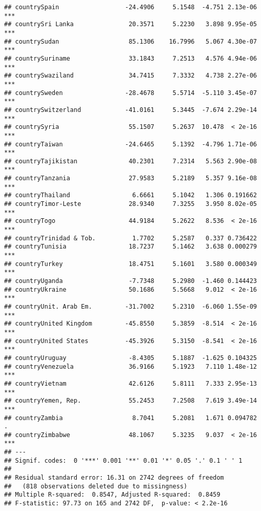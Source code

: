 \documentclass[
  11pt,
]{article}
\begin{document}
\begin{verbatim}
## countrySpain                  -24.4906     5.1548  -4.751 2.13e-06 ***
## countrySri Lanka               20.3571     5.2230   3.898 9.95e-05 ***
## countrySudan                   85.1306    16.7996   5.067 4.30e-07 ***
## countrySuriname                33.1843     7.2513   4.576 4.94e-06 ***
## countrySwaziland               34.7415     7.3332   4.738 2.27e-06 ***
## countrySweden                 -28.4678     5.5714  -5.110 3.45e-07 ***
## countrySwitzerland            -41.0161     5.3445  -7.674 2.29e-14 ***
## countrySyria                   55.1507     5.2637  10.478  < 2e-16 ***
## countryTaiwan                 -24.6465     5.1392  -4.796 1.71e-06 ***
## countryTajikistan              40.2301     7.2314   5.563 2.90e-08 ***
## countryTanzania                27.9583     5.2189   5.357 9.16e-08 ***
## countryThailand                 6.6661     5.1042   1.306 0.191662    
## countryTimor-Leste             28.9340     7.3255   3.950 8.02e-05 ***
## countryTogo                    44.9184     5.2622   8.536  < 2e-16 ***
## countryTrinidad & Tob.          1.7702     5.2587   0.337 0.736422    
## countryTunisia                 18.7237     5.1462   3.638 0.000279 ***
## countryTurkey                  18.4751     5.1601   3.580 0.000349 ***
## countryUganda                  -7.7348     5.2980  -1.460 0.144423    
## countryUkraine                 50.1686     5.5668   9.012  < 2e-16 ***
## countryUnit. Arab Em.         -31.7002     5.2310  -6.060 1.55e-09 ***
## countryUnited Kingdom         -45.8550     5.3859  -8.514  < 2e-16 ***
## countryUnited States          -45.3926     5.3150  -8.541  < 2e-16 ***
## countryUruguay                 -8.4305     5.1887  -1.625 0.104325    
## countryVenezuela               36.9166     5.1923   7.110 1.48e-12 ***
## countryVietnam                 42.6126     5.8111   7.333 2.95e-13 ***
## countryYemen, Rep.             55.2453     7.2508   7.619 3.49e-14 ***
## countryZambia                   8.7041     5.2081   1.671 0.094782 .  
## countryZimbabwe                48.1067     5.3235   9.037  < 2e-16 ***
## ---
## Signif. codes:  0 '***' 0.001 '**' 0.01 '*' 0.05 '.' 0.1 ' ' 1
## 
## Residual standard error: 16.31 on 2742 degrees of freedom
##   (818 observations deleted due to missingness)
## Multiple R-squared:  0.8547, Adjusted R-squared:  0.8459 
## F-statistic: 97.73 on 165 and 2742 DF,  p-value: < 2.2e-16
\end{verbatim}
\end{document}
